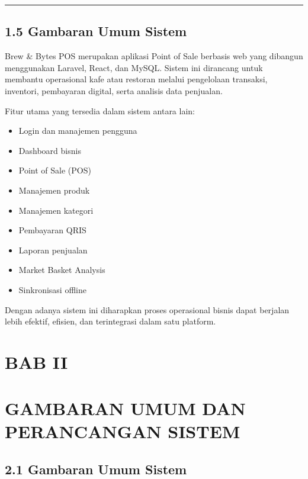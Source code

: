 \begin{center}\rule{0.5\linewidth}{0.5pt}\end{center}

\subsection{1.5 Gambaran Umum Sistem}\label{gambaran-umum-sistem}

Brew \& Bytes POS merupakan aplikasi Point of Sale berbasis web yang dibangun menggunakan Laravel, React, dan MySQL. Sistem ini dirancang untuk membantu operasional kafe atau restoran melalui pengelolaan transaksi, inventori, pembayaran digital, serta analisis data penjualan.

Fitur utama yang tersedia dalam sistem antara lain:

\begin{itemize}
\tightlist
\item
  Login dan manajemen pengguna
\item
  Dashboard bisnis
\item
  Point of Sale (POS)
\item
  Manajemen produk
\item
  Manajemen kategori
\item
  Pembayaran QRIS
\item
  Laporan penjualan
\item
  Market Basket Analysis
\item
  Sinkronisasi offline
\end{itemize}

Dengan adanya sistem ini diharapkan proses operasional bisnis dapat berjalan lebih efektif, efisien, dan terintegrasi dalam satu platform.

\section{BAB II}\label{bab-ii}

\section{GAMBARAN UMUM DAN PERANCANGAN SISTEM}\label{gambaran-umum-dan-perancangan-sistem}

\subsection{2.1 Gambaran Umum Sistem}\label{gambaran-umum-sistem-1}

